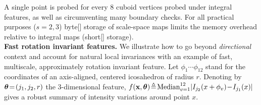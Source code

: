 A single point is probed for every $8$ cuboid vertices probed under integral features, as well as circumventing many boundary checks. For all practical purposes ($s=2,3$) byte[] storage of scale-space maps limits the memory overhead relative to integral maps (short[] storage).\\

\noindent
\textbf{Fast rotation invariant features.} We illustrate how to go beyond \textit{directional} context and account for natural local invariances with an example of fast, multiscale, approximately rotation invariant feature. Let $\phi_1\cdots\phi_{12}$ stand for the coordinates of an axis-aligned, centered icosahedron of radius $r$. Denoting by $\bm{\theta}\!=\!(j_1,j_2,r)$ the $3$-dimensional feature, $f(\boldsymbol{\mathrm{x}}, \bm{\theta})\!\triangleq\! \text{Median}_{v=1}^{12} \vert I_{j_2}(x+\phi_v)\!-\!I_{j_1}(x)\vert$ gives a robust summary of intensity variations around point $x$. %



